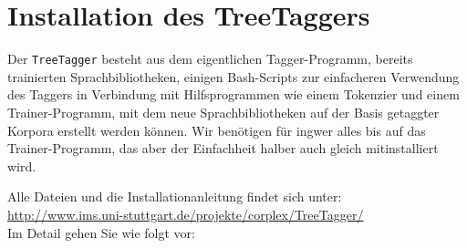 \documentclass[11pt]{scrartcl} %
\begin{document}
\section{Installation des TreeTaggers}
\label{treetagger}

Der \texttt{TreeTagger} besteht aus dem eigentlichen Tagger-Programm, bereits trainierten Sprachbibliotheken, einigen Bash-Scripts zur einfacheren Verwendung des Taggers in Verbindung mit Hilfsprogrammen wie einem Tokenzier und einem Trainer-Programm, mit dem neue Sprachbibliotheken auf der Basis getaggter Korpora erstellt werden können. Wir benötigen für ingwer alles bis auf das Trainer-Programm, das aber der Einfachheit halber auch gleich mitinstalliert wird.

Alle Dateien und die Installationanleitung findet sich unter:\\\url{http://www.ims.uni-stuttgart.de/projekte/corplex/TreeTagger/}\\Im Detail gehen Sie wie folgt vor:
\end{document}

